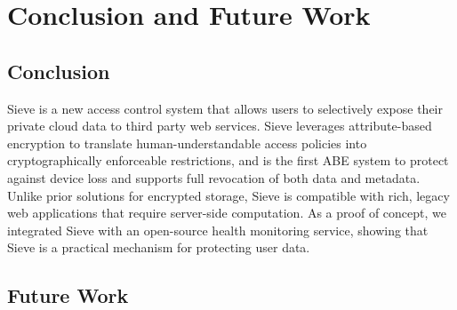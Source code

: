\chapter{Conclusion and Future Work}

\section{Conclusion}

Sieve is a new access control system
that allows users to selectively expose
their private cloud data to third party
web services. Sieve leverages attribute-based
encryption to translate human-understandable
access policies into cryptographically
enforceable restrictions, and
is the first ABE system to protect against
device loss and supports full revocation
of both data and metadata. Unlike prior
solutions for encrypted storage, Sieve is
compatible with rich, legacy web applications
that require server-side computation.
As a proof of concept, we integrated Sieve
with an open-source health monitoring
service, showing that Sieve is a
practical mechanism for protecting
user data.

\section{Future Work}

